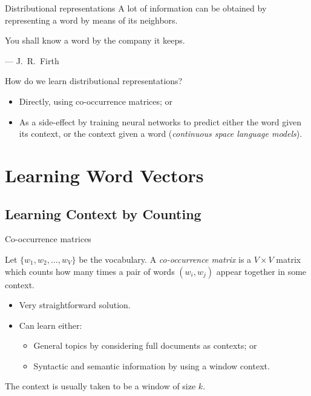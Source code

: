 \documentclass[serif, xcolor={svgnames, table}, usepdftitle=false]{beamer}
\begin{document}
\begin{frame}{Distributional representations}
  A lot of information can be obtained by representing a word by means of its neighbors.
  \begin{displayquote}
    You shall know a word by the company it keeps.\par\hfill--- J.\ R.\ Firth
  \end{displayquote}
  How do we learn distributional representations?
  \begin{itemize}
  \item Directly, using co-occurrence matrices; or
  \item As a side-effect by training neural networks to predict either the word
    given its context, or the context given a word (\emph{continuous space
      language models}).
  \end{itemize}
\end{frame}

\section{Learning Word Vectors}

\subsection{Learning Context by Counting}

\begin{frame}{Co-occurrence matrices}
  \begin{definition}
    Let \(\{w_1, w_2, \ldots, w_V\}\) be the vocabulary.  A \emph{co-occurrence
      matrix} is a \(V \times V\) matrix which counts how many times a pair of
    words \((w_i, w_j)\) appear together in some context.
  \end{definition}
  \begin{itemize}
  \item Very straightforward solution.
  \item Can learn either:
    \begin{itemize}
    \item General topics by considering full documents as contexts; or
    \item Syntactic and semantic information by using a window context.
    \end{itemize}
  \end{itemize}

  The context is usually taken to be a window of size \(k\).
\end{frame}
\end{document}
